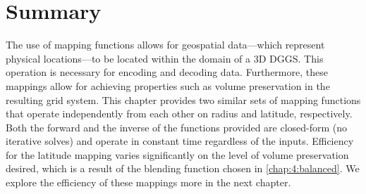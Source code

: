 \section{Summary}
The use of mapping functions allows for geospatial data---which represent physical locations---to be located within the domain of a 3D DGGS.
This operation is necessary for encoding and decoding data.
Furthermore, these mappings allow for achieving properties such as volume preservation in the resulting grid system.
This chapter provides two similar sets of mapping functions that operate independently from each other on radius and latitude, respectively.
Both the forward and the inverse of the functions provided are closed-form (no iterative solves) and operate in constant time regardless of the inputs.
Efficiency for the latitude mapping varies significantly on the level of volume preservation desired, which is a result of the blending function chosen in \cref{chap:4:balanced}.
We explore the efficiency of these mappings more in the next chapter.
